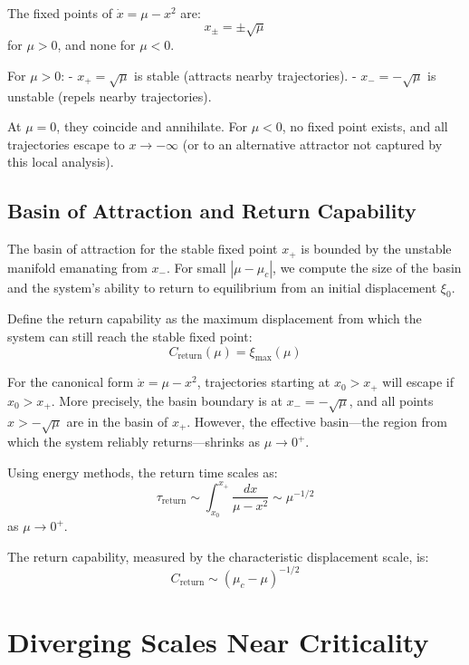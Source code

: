 \documentclass[12pt]{article}
\begin{document}
The fixed points of $\dot{x} = \mu - x^2$ are:
\begin{equation}
x_\pm = \pm\sqrt{\mu}
\end{equation}
for $\mu > 0$, and none for $\mu < 0$.

For $\mu > 0$:
- $x_+ = \sqrt{\mu}$ is stable (attracts nearby trajectories).
- $x_- = -\sqrt{\mu}$ is unstable (repels nearby trajectories).

At $\mu = 0$, they coincide and annihilate. For $\mu < 0$, no fixed point exists, and all trajectories escape to $x \to -\infty$ (or to an alternative attractor not captured by this local analysis).

\subsection{Basin of Attraction and Return Capability}

The basin of attraction for the stable fixed point $x_+$ is bounded by the unstable manifold emanating from $x_-$. For small $|\mu - \mu_c|$, we compute the size of the basin and the system's ability to return to equilibrium from an initial displacement $\xi_0$.

Define the return capability as the maximum displacement from which the system can still reach the stable fixed point:
\begin{equation}
C_{\text{return}}(\mu) = \xi_{\text{max}}(\mu)
\end{equation}

For the canonical form $\dot{x} = \mu - x^2$, trajectories starting at $x_0 > x_+$ will escape if $x_0 > x_+$. More precisely, the basin boundary is at $x_- = -\sqrt{\mu}$, and all points $x > -\sqrt{\mu}$ are in the basin of $x_+$. However, the effective basin—the region from which the system reliably returns—shrinks as $\mu \to 0^+$.

Using energy methods, the return time scales as:
\begin{equation}
\tau_{\text{return}} \sim \int_{x_0}^{x_+} \frac{dx}{\mu - x^2} \sim \mu^{-1/2}
\end{equation}
as $\mu \to 0^+$.

The return capability, measured by the characteristic displacement scale, is:
\begin{equation}
C_{\text{return}} \sim (\mu_c - \mu)^{-1/2}
\end{equation}

\section{Diverging Scales Near Criticality}
\end{document}
